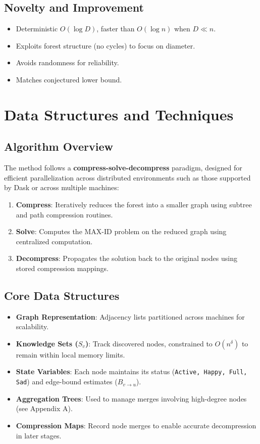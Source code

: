 \documentclass[11pt]{article}
\begin{document}
\subsection{Novelty and Improvement}
\begin{itemize}
    \item Deterministic \(O(\log D)\), faster than \(O(\log n)\) when \(D \ll n\).
    \item Exploits forest structure (no cycles) to focus on diameter.
    \item Avoids randomness for reliability.
    \item Matches conjectured lower bound.
\end{itemize}

\section{Data Structures and Techniques}

\subsection{Algorithm Overview}
The method follows a \textbf{compress-solve-decompress} paradigm, designed for efficient parallelization across distributed environments such as those supported by Dask or across multiple machines:

\begin{enumerate}
    \item \textbf{Compress}: Iteratively reduces the forest into a smaller graph using subtree and path compression routines.
    \item \textbf{Solve}: Computes the MAX-ID problem on the reduced graph using centralized computation.
    \item \textbf{Decompress}: Propagates the solution back to the original nodes using stored compression mappings.
\end{enumerate}

\subsection{Core Data Structures}
\begin{itemize}
    \item \textbf{Graph Representation}: Adjacency lists partitioned across machines for scalability.
    \item \textbf{Knowledge Sets (\(S_v\))}: Track discovered nodes, constrained to $O(n^\delta)$ to remain within local memory limits.
    \item \textbf{State Variables}: Each node maintains its status (\texttt{Active, Happy, Full, Sad}) and edge-bound estimates ($B_{v \rightarrow u}$).
    \item \textbf{Aggregation Trees}: Used to manage merges involving high-degree nodes (see Appendix A).
    \item \textbf{Compression Maps}: Record node merges to enable accurate decompression in later stages.
\end{itemize}
\end{document}
